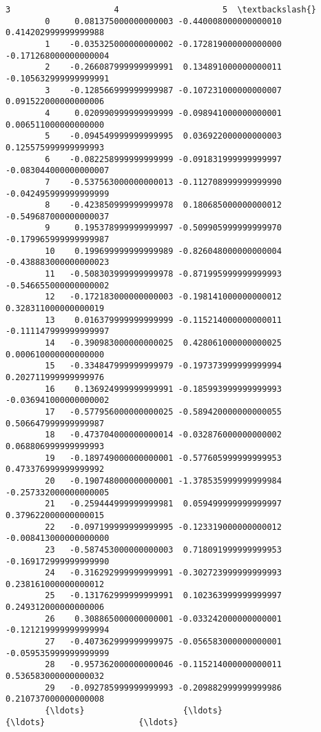 \documentclass[11pt]{article}
\begin{document}
\begin{Verbatim}[commandchars=\\\{\}]
                                 3                     4                     5  \textbackslash{}
        0     0.081375000000000003 -0.440008000000000010  0.414202999999999988   
        1    -0.035325000000000002 -0.172819000000000000 -0.171268000000000004   
        2    -0.266087999999999991  0.134891000000000011 -0.105632999999999991   
        3    -0.128566999999999987 -0.107231000000000007  0.091522000000000006   
        4     0.020990999999999999 -0.098941000000000001  0.006511000000000000   
        5    -0.094549999999999995  0.036922000000000003  0.125575999999999993   
        6    -0.082258999999999999 -0.091831999999999997 -0.083044000000000007   
        7    -0.537563000000000013 -0.112708999999999990 -0.042495999999999999   
        8    -0.423850999999999978  0.180685000000000012 -0.549687000000000037   
        9     0.195378999999999997 -0.509905999999999970 -0.179965999999999987   
        10    0.199699999999999989 -0.826048000000000004 -0.438883000000000023   
        11   -0.508303999999999978 -0.871995999999999993 -0.546655000000000002   
        12   -0.172183000000000003 -0.198141000000000012  0.328311000000000019   
        13    0.016379999999999999 -0.115214000000000011 -0.111147999999999997   
        14   -0.390983000000000025  0.428061000000000025  0.000610000000000000   
        15   -0.334847999999999979 -0.197373999999999994  0.202711999999999976   
        16    0.136924999999999991 -0.185993999999999993 -0.036941000000000002   
        17   -0.577956000000000025 -0.589420000000000055  0.506647999999999987   
        18   -0.473704000000000014 -0.032876000000000002  0.068806999999999993   
        19   -0.189749000000000001 -0.577605999999999953  0.473376999999999992   
        20   -0.190748000000000001 -1.378535999999999984 -0.257332000000000005   
        21   -0.259444999999999981  0.059499999999999997  0.379622000000000015   
        22   -0.097199999999999995 -0.123319000000000012 -0.008413000000000000   
        23   -0.587453000000000003  0.718091999999999953 -0.169172999999999990   
        24   -0.316292999999999991 -0.302723999999999993  0.238161000000000012   
        25   -0.131762999999999991  0.102363999999999997  0.249312000000000006   
        26    0.308865000000000001 -0.033242000000000001 -0.121219999999999994   
        27   -0.407362999999999975 -0.056583000000000001 -0.059535999999999999   
        28   -0.957362000000000046 -0.115214000000000011  0.536583000000000032   
        29   -0.092785999999999993 -0.209882999999999986  0.210737000000000008   
        {\ldots}                    {\ldots}                   {\ldots}                   {\ldots}   

\end{Verbatim}
\end{document}
